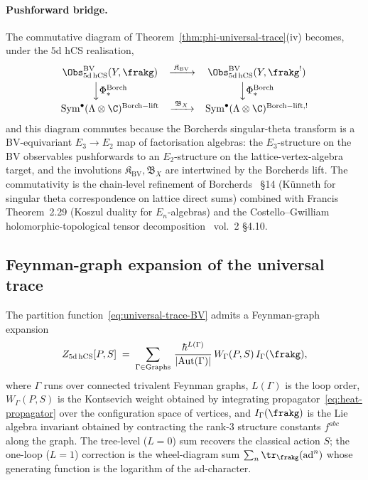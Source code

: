 \paragraph{Pushforward bridge.}
The commutative diagram of
Theorem~\ref{thm:phi-universal-trace}(iv) becomes, under the $5$d hCS
realisation,
\begin{equation*}
\begin{array}{ccc}
  \Obs^{\mathrm{BV}}_{5\mathrm{d\,hCS}}(Y,\frakg)
  & \xrightarrow{\;\mathfrak{K}_{\mathrm{BV}}\;} &
  \Obs^{\mathrm{BV}}_{5\mathrm{d\,hCS}}(Y,\frakg^!) \\[0.3em]
  \Big\downarrow\Phi^{\mathrm{Borch}}_* & & \Big\downarrow\Phi^{\mathrm{Borch}}_* \\[0.3em]
  \mathrm{Sym}^\bullet(\Lambda\otimes\C)^{\mathrm{Borch-lift}}
  & \xrightarrow{\;\mathfrak{B}_X\;} &
  \mathrm{Sym}^\bullet(\Lambda\otimes\C)^{\mathrm{Borch-lift},!}
\end{array}
\end{equation*}
and this diagram commutes because the Borcherds singular-theta
transform is a BV-equivariant $E_3\to E_2$ map of factorisation
algebras: the $E_3$-structure on the BV observables pushforwards to
an $E_2$-structure on the lattice-vertex-algebra target, and the
involutions $\mathfrak{K}_{\mathrm{BV}}, \mathfrak{B}_X$ are intertwined
by the Borcherds lift. The commutativity is the chain-level refinement
of Borcherds~\cite{Borcherds1998} §14 (K\"unneth for singular theta
correspondence on lattice direct sums) combined with
Francis~\cite{Francis2013} Theorem~2.29 (Koszul duality for
$E_n$-algebras) and the Costello--Gwilliam holomorphic-topological
tensor decomposition~\cite{CostelloGwilliam} vol.~2 §4.10.

\subsection*{Feynman-graph expansion of the universal trace}

The partition function~\eqref{eq:universal-trace-BV} admits a
Feynman-graph expansion
\begin{equation}
\label{eq:feynman-expansion}
  Z_{5\mathrm{d\,hCS}}[P,S] \;=\; \sum_{\Gamma \in \mathrm{Graphs}}\,
  \frac{\hbar^{L(\Gamma)}}{|\mathrm{Aut}(\Gamma)|}\,
  W_\Gamma(P, S)\, I_\Gamma(\frakg),
\end{equation}
where $\Gamma$ runs over connected trivalent Feynman graphs, $L(\Gamma)$
is the loop order, $W_\Gamma(P,S)$ is the Kontsevich weight obtained
by integrating propagator~\eqref{eq:heat-propagator} over the
configuration space of vertices, and $I_\Gamma(\frakg)$ is the Lie
algebra invariant obtained by contracting the rank-$3$ structure
constants $f^{abc}$ along the graph. The tree-level ($L = 0$) sum
recovers the classical action $S$; the one-loop ($L = 1$) correction
is the wheel-diagram sum
$\sum_n \tr_\frakg(\mathrm{ad}^n)$ whose generating function is the
logarithm of the $\mathrm{ad}$-character.

